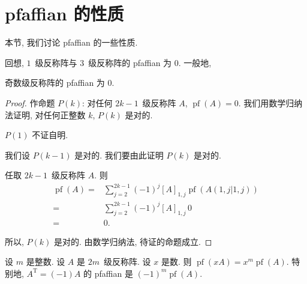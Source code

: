 \documentclass[../libro.tex]{subfiles}
\begin{document}
\section{pfaffian 的性质}

本节, 我们讨论 pfaffian 的一些性质.

回想, \(1\)~级反称阵与 \(3\)~级反称阵的 pfaffian 为 \(0\).
一般地,

\begin{theorem}
    奇数级反称阵的 pfaffian 为 \(0\).
\end{theorem}

\begin{proof}
    作命题 \(P(k)\):
    对任何 \(2k-1\)~级反称阵 \(A\),
    \(\operatorname{pf} {(A)} = 0\).
    我们用数学归纳法证明,
    对任何正整数 \(k\), \(P(k)\) 是对的.

    \(P(1)\) 不证自明.

    我们设 \(P(k-1)\) 是对的.
    我们要由此证明 \(P(k)\) 是对的.

    任取 \(2k-1\)~级反称阵 \(A\).
    则
    \begin{align*}
        \operatorname{pf} {(A)}
        = {} &
        \sum_{j = 2}^{2k-1}
        {(-1)^{j} [A]_{1,j}
        \operatorname{pf} {(A({1,j}|{1,j}))}}
        \\
        = {} &
        \sum_{j = 2}^{2k-1}
        {(-1)^{j} [A]_{1,j}\, 0}
        \\
        = {} &
        0.
    \end{align*}

    所以, \(P(k)\) 是对的.
    由数学归纳法, 待证的命题成立.
\end{proof}

\begin{theorem}
    设 \(m\) 是整数.
    设 \(A\) 是 \(2m\)~级反称阵.
    设 \(x\) 是数.
    则 \(\operatorname{pf} {(xA)}
    = x^m \operatorname{pf} {(A)}\).
    特别地, \(A^{\mathrm{T}} = (-1)A\) 的 pfaffian
    是 \((-1)^m \operatorname{pf} {(A)}\).
\end{theorem}
\end{document}

